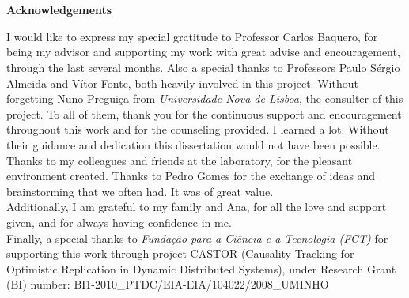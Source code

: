 \chapter*{}
\begin{center}\textbf{Acknowledgements}\end{center}
	
I would like to express my special gratitude to Professor Carlos Baquero, for being my advisor and supporting my work with great advise and encouragement, through the last several months. Also a special thanks to Professors Paulo Sérgio Almeida and Vítor Fonte, both heavily involved in this project. Without forgetting Nuno Preguiça from \emph{Universidade Nova de Lisboa}, the consulter of this project. To all of them, thank you for the continuous support and encouragement throughout this work and for the counseling provided. I learned a lot. Without their guidance and dedication this dissertation would not have been possible.\\
Thanks to my colleagues and friends at the laboratory, for the pleasant environment created. Thanks to Pedro Gomes for the exchange of ideas and brainstorming that we often had. It was of great value.\\
Additionally, I am grateful to my family and Ana, for all the love and support given, and for always having confidence in me.\\
Finally, a special thanks to \emph{Fundação para a Ciência e a Tecnologia (FCT)} for supporting this work through project CASTOR (Causality Tracking for Optimistic Replication in Dynamic Distributed Systems), under Research Grant (BI) number: BI1-2010\_PTDC/EIA-EIA/104022/2008\_UMINHO



\thispagestyle{empty}
